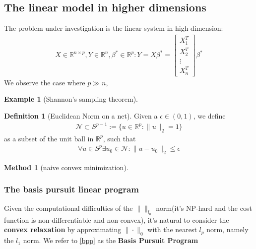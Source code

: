 \documentclass[a4paper,12pt, oneside, fleqn]{book}
\newtheorem{method}[theorem]{Method}
\theoremstyle{definition}
\newtheorem{definition}{Definition}[section]
\newtheorem*{example}{Example}
\theoremstyle{remark}
\begin{document}
\subsection{The linear model in higher dimensions}
The problem under investigation is the linear system in high dimension:
\begin{align*}
X \in \mathbb{R}^{n \times p}, Y \in \mathbb{R}^n, \beta^* \in \mathbb{R}^p: 
 Y = X \beta^* = 
 \begin{bmatrix}
 	X_1^T\\
 	X_2^T\\
 	\vdots\\
 	X_n^T
 \end{bmatrix}	\beta^*
\end{align*}
We observe the case where $p \gg n$, 


\begin{example}[Shannon's sampling theorem]
\end{example}



\begin{definition}[Euclidean Norm on a net]
Given a $\epsilon \in (0, 1)$, we define
	\begin{align*}
		\mathcal{N} \subset S^{p-1} := \{u \in \mathbb{R}^p: \|u\|_2 = 1\}
	\end{align*}
	as a subset of the unit ball in $\mathbb{R}^p$, such that
	\begin{align*}
		\forall u \in S^p \exists u_0 \in \mathcal{N}: \|u- u_0\|_2 \leq \epsilon
	\end{align*}
\end{definition}





\begin{method}[naive convex minimization]
\end{method}

\subsubsection*{The basis pursuit linear program}

Given the computational difficulties of the $\|\|_{l_0}$ norm(it's NP-hard and the cost function is non-differentiable and non-convex), it's natural to consider the \textbf{convex relaxation} by approximating $\|\cdot\|_0$ with the nearest $l_p$ norm, namely the $l_1$ norm. We refer to \ref{bpp} as the \textbf{Basis Pursuit Program}
\end{document}

